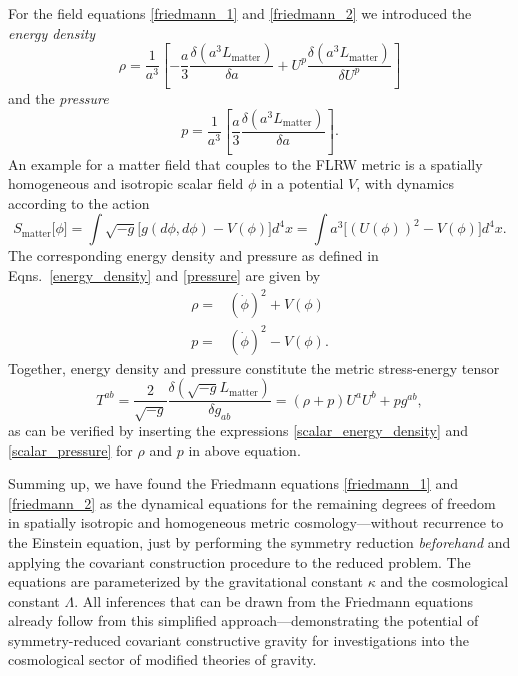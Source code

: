 For the field equations \eqref{friedmann_1} and \eqref{friedmann_2} we introduced the \emph{energy density}
\begin{equation}\label{energy_density}
  \rho = \frac{1}{a^3}\left\lbrack -\frac{a}{3} \frac{\delta(a^3 L_\text{matter})}{\delta a} + U^p \frac{\delta(a^3L_\text{matter})}{\delta U^p}\right\rbrack
\end{equation}
and the \emph{pressure}
\begin{equation}\label{pressure}
  p = \frac{1}{a^3} \left\lbrack \frac{a}{3} \frac{\delta(a^3L_\text{matter})}{\delta a}\right\rbrack.
\end{equation}
An example for a matter field that couples to the FLRW metric is a spatially homogeneous and isotropic scalar field $\phi$ in a potential $V$, with dynamics according to the action
\begin{equation}
  S_\text{matter}\lbrack\phi\rbrack = \int \sqrt{-g}\lbrack g(d\phi,d\phi) - V(\phi)\rbrack d^4x = \int a^3\lbrack (U(\phi))^2 - V(\phi)\rbrack d^4x.
\end{equation}
The corresponding energy density and pressure as defined in Eqns.~\eqref{energy_density} and \eqref{pressure} are given by
\begin{align}
  \rho = {} & (\dot\phi)^2 + V(\phi) \label{scalar_energy_density}\\
  p = {} & (\dot\phi)^2 - V(\phi) \label{scalar_pressure}.
\end{align}
Together, energy density and pressure constitute the metric stress-energy tensor
\begin{equation}
  T^{ab} = \frac{2}{\sqrt{-g}}\frac{\delta(\sqrt{-g}L_\text{matter})}{\delta g_{ab}} = (\rho + p)U^aU^b + pg^{ab},
\end{equation}
as can be verified by inserting the expressions \eqref{scalar_energy_density} and \eqref{scalar_pressure} for $\rho$ and $p$ in above equation.

Summing up, we have found the Friedmann equations \eqref{friedmann_1} and \eqref{friedmann_2} as the dynamical equations for the remaining degrees of freedom in spatially isotropic and homogeneous metric cosmology---without recurrence to the Einstein equation, just by performing the symmetry reduction \emph{beforehand} and applying the covariant construction procedure to the reduced problem. The equations are parameterized by the gravitational constant $\kappa$ and the cosmological constant $\Lambda$. All inferences that can be drawn from the Friedmann equations already follow from this simplified approach---demonstrating the potential of symmetry-reduced covariant constructive gravity for investigations into the cosmological sector of modified theories of gravity.


